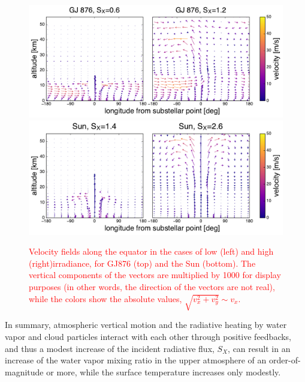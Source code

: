 \documentclass[11pt,numberedappendix,twocolappendix,]{emulateapj}
\def\wv{water vapor}
\def\addYF#1{\textcolor{red}{#1}}
\begin{document}
\begin{figure}[htb]
    \begin{center}
    \includegraphics[width=1\hsize]{GJ876_vectormap_2panels_z_1000.pdf}
    \includegraphics[width=1\hsize]{Sun_vectormap_2panels_z_1000.pdf}
    \end{center}
\caption{\addYF{Velocity fields along the equator in the cases of low (left) and high (right)irradiance, for GJ876 (top) and the Sun (bottom). The vertical components of the vectors are multiplied by 1000 for display purposes (in other words, the direction of the vectors are not real), while the colors show the absolute values, $\sqrt{v_x^2 + v_y^2} \sim  v_x$. }}
\label{fig:vectormap}
\end{figure}

In summary, atmospheric vertical motion and the radiative heating by \wv{} and cloud particles interact with each other through positive feedbacks, and thus a modest increase of the incident radiative flux, $S_X$, can result in  an increase of the \wv{} mixing ratio in the upper atmosphere of an order-of-magnitude or more, while the surface temperature increases only modestly. 
\end{document}
